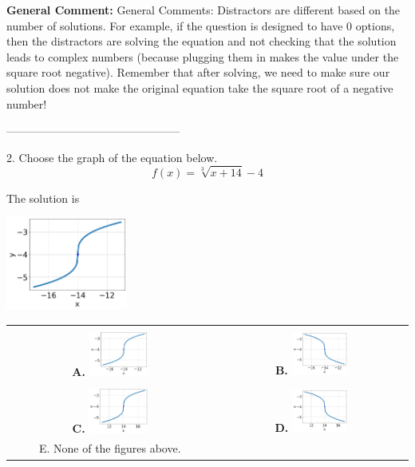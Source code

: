 \documentclass{extbook}[14pt]
\begin{document}
\textbf{General Comment:} General Comments: Distractors are different based on the number of solutions. For example, if the question is designed to have 0 options, then the distractors are solving the equation and not checking that the solution leads to complex numbers (because plugging them in makes the value under the square root negative). Remember that after solving, we need to make sure our solution does not make the original equation take the square root of a negative number! 

-----------------------------------------------

2. Choose the graph of the equation below.
\[ f(x) = \sqrt[3]{x + 14} - 4 \] 

 
 The solution is  
 \begin{center} \includegraphics[width=0.3\textwidth]{../Figures/radicalEquationToGraphCB.png} \end{center}\begin{tabular}{|c|c|} 
\hline 
 & \tabularnewline 
 \textbf{A.} \includegraphics[width=0.3\textwidth]{../Figures/radicalEquationToGraphCB.png} & \textbf{B.} \includegraphics[width=0.3\textwidth]{../Figures/radicalEquationToGraphAB.png} \tabularnewline 
\hline 
 & \tabularnewline 
 \textbf{C.} \includegraphics[width=0.3\textwidth]{../Figures/radicalEquationToGraphBB.png} & \textbf{D.} \includegraphics[width=0.3\textwidth]{../Figures/radicalEquationToGraphDB.png} \tabularnewline 
\hline 
 E. None of the figures above. & \tabularnewline 
\hline 
 \end{tabular} 
 
\end{document}
